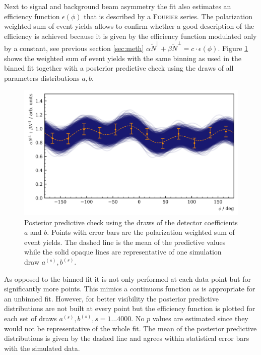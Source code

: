 Next to signal and background beam asymmetry the fit also estimates an efficiency function $\epsilon(\phi)$ that is described by a \textsc{Fourier} series. The polarization weighted sum of event yields allows to confirm whether a good description of the efficiency is achieved because it is given by the efficiency function modulated only by a constant, see previous section \ref{sec:meth} $\alpha \tilde{N}^\parallel + \beta\tilde{N}^\bot = c\cdot\epsilon\left(\phi\right).$ Figure \ref{fig:toyMC_eff_func} shows the weighted sum of event yields with the same binning as used in the binned fit together with a posterior predictive check using the draws of all parameters distributions $a,b$. 
\begin{figure}[htbp]
	\centering
	\includegraphics[width=\linewidth]{../bayes/event_based_fit/plots/toyMC_eff_PPC.png}
	\caption{Posterior predictive check using the draws of the detector coefficients $a$ and $b$. Points with error bars are the polarization weighted sum of event yields. The dashed line is the mean of the predictive values while the solid opaque lines are representative of one simulation draw $a^{(s)},b^{(s)}$.}
	\label{fig:toyMC_eff_func}
\end{figure}
As opposed to the binned fit it is not only performed at each data point but for significantly more points. This mimics a continuous function as is appropriate for an unbinned fit. However, for better visibility the posterior predictive distributions are not built at every point but the efficiency function is plotted for each set of draws $a^{(s)},b^{(s)}, s=1\dots4000$. No $p$ values are estimated since they would not be representative of the whole fit. The mean of the posterior predictive distributions is given by the dashed line and agrees within statistical error bars with the simulated data.
\newpage
